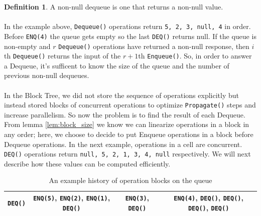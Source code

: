 \documentclass[10pt]{article}
\theoremstyle{definition}
\newtheorem{definition}[theorem]{Definition}
\begin{document}
\begin{definition}
A non-null dequeue is one that returns a non-null value.
\end{definition}

\paragraph{}
In the example above, \texttt{Dequeue()} operations return \texttt{5, 2, 3, null, 4} in order. Before \texttt{ENQ(4)} the queue gets empty so the last \texttt{DEQ()} returns null. If the queue is non-empty and $r$ \texttt{Dequeue()} operations have returned a non-null response, then $i$th \texttt{Dequeue()} returns the input of the $r+1$th \texttt{Enqueue()}. So, in order to answer a Dequeue, it's sufficent to know the size of the queue and the number of previous non-null dequeues.




\paragraph{}
In the Block Tree, we did not store the sequence of operations explicitly but instead stored blocks of concurrent operations to optimize \texttt{Propagate()} steps and increase parallelism. So now the problem is to find the result of each Dequeue. From lemma \ref{lem:block_size} we know we can linearize operations in a block in any order; here, we choose to decide to put Enqueue operations in a block before Dequeue operations. In the next example, operations in a cell are concurrent. \texttt{DEQ()} operations return \texttt{null, 5, 2, 1, 3, 4, null} respectively. We will next describe how these values can be computed efficiently.

\begin{table}[hbt]
\centering
  \begin{tabular}{c|c|c|c}
    \hline \texttt{DEQ()} & \texttt{ENQ(5)}, \texttt{ENQ(2)}, \texttt{ENQ(1)}, \texttt{DEQ()}& \texttt{ENQ(3)}, \texttt{DEQ()}&  \texttt{ENQ(4)}, \texttt{DEQ()}, \texttt{DEQ()}, \texttt{DEQ()}, \texttt{DEQ()}\\ \hline
  \end{tabular}
  \caption{An example history of operation blocks on the queue}
\end{table}
\end{document}
